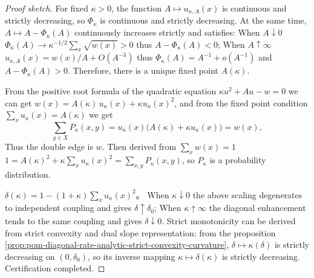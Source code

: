 \begin{proof}[Proof sketch]
For fixed \(\kappa>0\), the function \(A\mapsto u_{\kappa,A}(x)\) is continuous and strictly decreasing, so \(\Phi_\kappa\) is continuous and strictly decreasing.
At the same time, \(A\mapsto A-\Phi_\kappa(A)\) continuously increases strictly and satisfies:
When \(A\downarrow 0\) \(\Phi_\kappa(A)\to \kappa^{-1/2}\sum_x\sqrt{w(x)}>0\) thus \(A-\Phi_\kappa(A)<0\);
When \(A\uparrow\infty\) \(u_{\kappa,A}(x)=w(x)/A+O(A^{-3})\) thus \(\Phi_\kappa(A)=A^{-1}+o(A^{-1})\) and \(A-\Phi_\kappa(A)>0\).
Therefore, there is a unique fixed point \(A(\kappa)\).
\par
From the positive root formula of the quadratic equation \(\kappa u^2+Au-w=0\) we can get
\(
w(x)=A(\kappa)\,u_\kappa(x)+\kappa u_\kappa(x)^2
\), and from the fixed point condition \(\sum_x u_\kappa(x)=A(\kappa)\) we get
\[
\sum_{y\in X}P_\kappa(x,y)=u_\kappa(x)\bigl(A(\kappa)+\kappa u_\kappa(x)\bigr)=w(x),
\]
Thus the double edge is \(w\).
Then derived from \(\sum_x w(x)=1\)
\(
1=A(\kappa)^2+\kappa\sum_x u_\kappa(x)^2
=\sum_{x,y}P_\kappa(x,y)
\), so \(P_\kappa\) is a probability distribution.
\par
\(\delta(\kappa)=1-(1+\kappa)\sum_x u_\kappa(x)^2\)。
When \(\kappa\downarrow 0\) the above scaling degenerates to independent coupling and gives \(\delta\uparrow \delta_0\);
When \(\kappa\uparrow\infty\) the diagonal enhancement tends to the same coupling and gives \(\delta\downarrow 0\).
Strict monotonicity can be derived from strict convexity and dual slope representation: from the proposition \ref{prop:pom-diagonal-rate-analytic-strict-convexity-curvature},
\(\delta\mapsto\kappa(\delta)\) is strictly decreasing on \((0,\delta_0)\), so its inverse mapping \(\kappa\mapsto\delta(\kappa)\) is strictly decreasing. Certification completed.
\end{proof}


